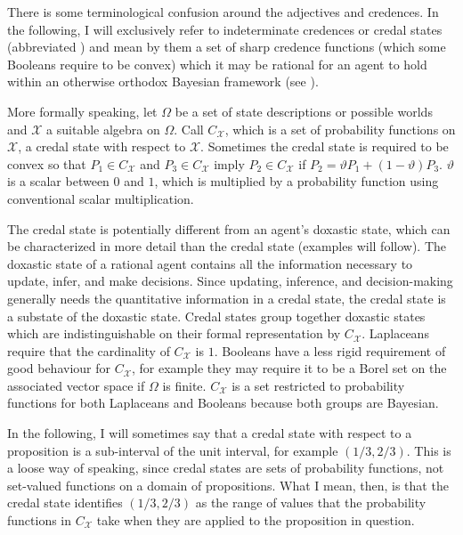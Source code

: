 \documentclass[11pt]{article}
\begin{document}
There is some terminological confusion around the adjectives
  and  credences.
In the following, I will exclusively refer to indeterminate credences
or credal states (abbreviated ) and mean by them a set
of sharp credence functions (which some Booleans require to be convex)
which it may be rational for an agent to hold within an otherwise
orthodox Bayesian framework (see ). 

More formally speaking, let $\Omega$ be a set of state descriptions or
possible worlds and $\mathcal{X}$ a suitable algebra on $\Omega$. Call
$C_{\mathcal{X}}$, which is a set of probability functions on
$\mathcal{X}$, a credal state with respect to $\mathcal{X}$. Sometimes
the credal state is required to be convex so that
$P_{1}\in{}C_{\mathcal{X}}$ and $P_{3}\in{}C_{\mathcal{X}}$ imply
$P_{2}\in{}C_{\mathcal{X}}$ if
$P_{2}=\vartheta{}P_{1}+(1-\vartheta)P_{3}$. $\vartheta$ is a scalar
between $0$ and $1$, which is multiplied by a probability function
using conventional scalar multiplication.


The credal state is potentially different from an agent's doxastic
state, which can be characterized in more detail than the credal state
(examples will follow). The doxastic state of a rational agent
contains all the information necessary to update, infer, and make
decisions. Since updating, inference, and decision-making generally
needs the quantitative information in a credal state, the credal state
is a substate of the doxastic state. Credal states group together
doxastic states which are indistinguishable on their formal
representation by $C_{\mathcal{X}}$. Laplaceans require that the
cardinality of $C_{\mathcal{X}}$ is $1$. Booleans have a less rigid
requirement of good behaviour for $C_{\mathcal{X}}$, for example they
may require it to be a Borel set on the associated vector space if
$\Omega$ is finite. $C_{\mathcal{X}}$ is a set restricted to
probability functions for both Laplaceans and Booleans because both
groups are Bayesian.

In the following, I will sometimes say that a credal state with
respect to a proposition is a sub-interval of the unit interval, for
example $(1/3,2/3)$. This is a loose way of speaking, since credal
states are sets of probability functions, not set-valued functions on
a domain of propositions. What I mean, then, is that the credal state
identifies $(1/3,2/3)$ as the range of values that the probability
functions in $C_{\mathcal{X}}$ take when they are applied to the
proposition in question.
\end{document}
